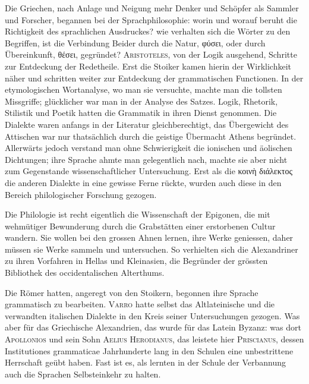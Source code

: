 Die Griechen, nach Anlage und Neigung mehr Denker und Schöpfer als Sammler und Forscher, begannen bei der Sprachphilosophie: worin und worauf beruht die Richtigkeit des sprachlichen Ausdruckes? wie verhalten sich die Wörter zu den Begriffen, ist die Verbindung Beider durch die Natur, φύσει, oder durch Übereinkunft, θέσει, gegründet?  \textsc{Aristoteles}, von der Logik ausgehend,  Schritte zur Entdeckung der Redetheile. Erst die Stoiker kamen hierin der Wirklichkeit näher und schritten weiter zur Entdeckung der grammatischen Functionen. In der etymologischen Wortanalyse, wo man sie versuchte, machte man die tollsten Missgriffe; glücklicher war man in der Analyse des Satzes. Logik, Rhetorik, Stilistik und Poetik hatten die Grammatik in ihren Dienst genommen. Die Dialekte waren anfangs in der Literatur gleichberechtigt, das Übergewicht des Attischen war nur thatsächlich durch die geistige Übermacht Athens begründet. Allerwärts jedoch verstand man ohne Schwierigkeit die ionischen und äolischen Dichtungen; ihre Sprache ahmte man gelegentlich \label{sp.21} nach, machte sie aber nicht zum Gegenstande wissenschaftlicher Untersuchung. Erst als die κοινὴ διάλεκτος die anderen Dialekte in eine gewisse Ferne rückte, wurden auch diese in den Bereich philologischer Forschung gezogen.

\label{I.IV.byzanz}
Die Philologie ist recht eigentlich die Wissenschaft der Epigonen, die mit wehmütiger Bewunderung durch die Grabstätten einer erstorbenen \label{fp.20} Cultur wandern. Sie wollen bei den grossen Ahnen lernen, ihre Werke geniessen, daher müssen sie  Werke sammeln und untersuchen. So verhielten sich die Alexandriner zu ihren Vorfahren in Hellas und Kleinasien, die Begründer der grössten Bibliothek des occidentalischen Alterthums.

Die Römer hatten, angeregt von den Stoikern, begonnen ihre Sprache grammatisch zu bearbeiten. \textsc{Varro} hatte selbst das Altlateinische und die verwandten italischen Dialekte in den Kreis seiner Untersuchungen gezogen. Was aber für das Griechische Alexandrien, das wurde für das Latein Byzanz: was dort \textsc{Apollonios}  und sein Sohn \textsc{Aelius Herodianus}, das leistete hier \textsc{Priscianus}, dessen Institutiones grammaticae Jahrhunderte lang in den Schulen eine unbestrittene Herrschaft geübt haben. Fast ist es, als lernten in der Schule der Verbannung auch die Sprachen Selbsteinkehr zu halten.

